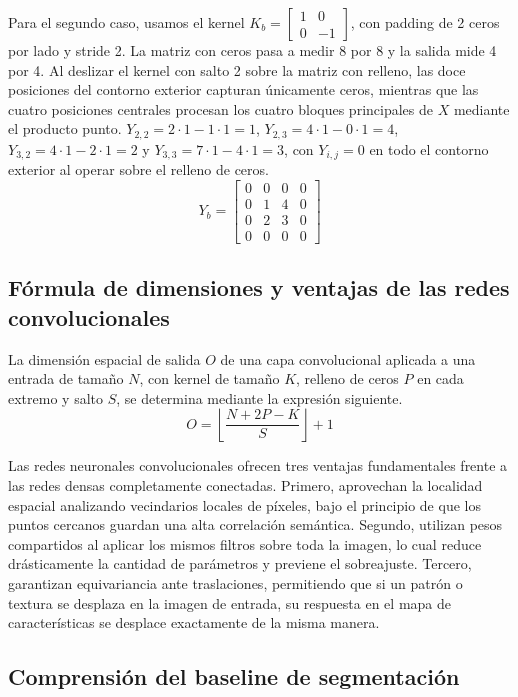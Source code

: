\documentclass[10pt,letterpaper]{article}
\newcommand{\sangria}{\hspace*{1.5em}}
\begin{document}
Para el segundo caso, usamos el kernel $K_b = \begin{bmatrix} 1 & 0 \\ 0 & -1 \end{bmatrix}$, con padding de 2 ceros por lado y stride 2. La matriz con ceros pasa a medir 8 por 8 y la salida mide 4 por 4. Al deslizar el kernel con salto 2 sobre la matriz con relleno, las doce posiciones del contorno exterior capturan únicamente ceros, mientras que las cuatro posiciones centrales procesan los cuatro bloques principales de $X$ mediante el producto punto. $Y_{2,2} = 2 \cdot 1 - 1 \cdot 1 = 1$, $Y_{2,3} = 4 \cdot 1 - 0 \cdot 1 = 4$, $Y_{3,2} = 4 \cdot 1 - 2 \cdot 1 = 2$ y $Y_{3,3} = 7 \cdot 1 - 4 \cdot 1 = 3$, con $Y_{i,j} = 0$ en todo el contorno exterior al operar sobre el relleno de ceros.
\[
    Y_b = \begin{bmatrix}
        0 & 0 & 0 & 0 \\
        0 & 1 & 4 & 0 \\
        0 & 2 & 3 & 0 \\
        0 & 0 & 0 & 0
    \end{bmatrix}
\]

\subsection{Fórmula de dimensiones y ventajas de las redes convolucionales}

\sangria La dimensión espacial de salida $O$ de una capa convolucional aplicada a una entrada de tamaño $N$, con kernel de tamaño $K$, relleno de ceros $P$ en cada extremo y salto $S$, se determina mediante la expresión siguiente.
\[
    O = \left\lfloor \frac{N + 2P - K}{S} \right\rfloor + 1
\]

Las redes neuronales convolucionales ofrecen tres ventajas fundamentales frente a las redes densas completamente conectadas. Primero, aprovechan la localidad espacial analizando vecindarios locales de píxeles, bajo el principio de que los puntos cercanos guardan una alta correlación semántica. Segundo, utilizan pesos compartidos al aplicar los mismos filtros sobre toda la imagen, lo cual reduce drásticamente la cantidad de parámetros y previene el sobreajuste. Tercero, garantizan equivariancia ante traslaciones, permitiendo que si un patrón o textura se desplaza en la imagen de entrada, su respuesta en el mapa de características se desplace exactamente de la misma manera.

\subsection{Comprensión del baseline de segmentación}
\end{document}
